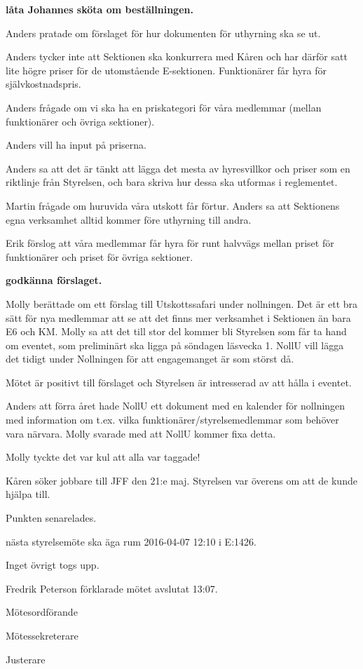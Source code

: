 \documentclass[10pt]{article}
\def\mo{Fredrik Peterson}
\def\ms{Erik Månsson}
\def\ji{Martin Gemborn Nilsson}
\begin{document}
\begin{paragrafer}
\textbf{\Mba låta Johannes sköta om beställningen.}

Anders pratade om förslaget för hur dokumenten för uthyrning ska se ut.

Anders tycker inte att Sektionen ska konkurrera med Kåren och har därför satt lite högre priser för de utomstående E-sektionen. Funktionärer får hyra för självkostnadspris.

Anders frågade om vi ska ha en priskategori för våra medlemmar (mellan funktionärer och övriga sektioner).

Anders vill ha input på priserna.

Anders sa att det är tänkt att lägga det mesta av hyresvillkor och priser som en riktlinje från Styrelsen, och bara skriva hur dessa ska utformas i reglementet.

Martin frågade om huruvida våra utskott får förtur. Anders sa att Sektionens egna verksamhet alltid kommer före uthyrning till andra.

Erik förslog att våra medlemmar får hyra för runt halvvägs mellan priset för funktionärer och priset för övriga sektioner.

\textbf{\Mba godkänna förslaget.}

Molly berättade om ett förslag till Utskottssafari under nollningen. Det är ett bra sätt för nya medlemmar att se att det finns mer verksamhet i Sektionen än bara E6 och KM. Molly sa att det till stor del kommer bli Styrelsen som får ta hand om eventet, som preliminärt ska ligga på söndagen läsvecka 1. NollU vill lägga det tidigt under Nollningen för att engagemanget är som störst då.

Mötet är positivt till förslaget och Styrelsen är intresserad av att hålla i eventet.

Anders att förra året hade NollU ett dokument med en kalender för nollningen med information om t.ex. vilka funktionärer/styrelsemedlemmar som behöver vara närvara. Molly svarade med att NollU kommer fixa detta.

Molly tyckte det var kul att alla var taggade!

Kåren söker jobbare till JFF den 21:e maj. Styrelsen var överens om att de kunde hjälpa till.

Punkten senarelades.

\Mba nästa styrelsemöte ska äga rum 2016-04-07 12:10 i E:1426.

\Ibfu

Inget övrigt togs upp.

{\mo} förklarade mötet avslutat 13:07.

\end{paragrafer}

\newpage
\hidesignfoot
\begin{signatures}{3}
\signature{\mo}{Mötesordförande}
\signature{\ms}{Mötessekreterare}
\signature{\ji}{Justerare}
\end{signatures}
\end{document}
